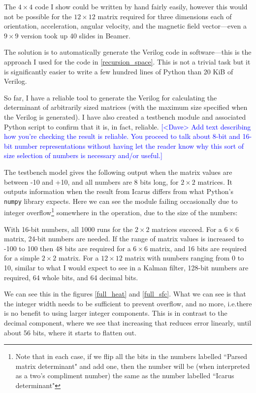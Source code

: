 \documentclass[12pt]{article}
\newcommand{\note}[2][red]{\textcolor{#1}{#2}}
\newcommand{\notedme}[1]{\note[blue]{[<Dave> #1]}}
\begin{document}
The $4\times4$ code I show could be written by hand fairly easily, however this would not be possible for the $12\times12$ matrix required for three dimensions each of orientation, acceleration, angular velocity, and the magnetic field vector---even a $9\times9$ version took up 40 slides in Beamer.

The solution is to automatically generate the Verilog code in software---this is the approach I used for the code in \ref{recursion_space}. This is not a trivial task but it is significantly easier to write a few hundred lines of Python than 20 KiB of Verilog.

So far, I have a reliable tool to generate the Verilog for calculating the determinant of arbitrarily sized matrices (with the maximum size specified when the Verilog is generated). I have also created a testbench module and associated Python script to confirm that it is, in fact, reliable.
\notedme{Add text describing how you're checking the result is reliable. You proceed to talk about 8-bit and 16-bit number representations without having let the reader know why this sort of size selection of numbers is necessary and/or useful.}

The testbench model gives the following output when the matrix values are between -10 and +10, and all numbers are 8 bits long, for $2\times2$ matrices. It outputs information when the result from Icarus differs from what Python's \lstinline|numpy| library expects. Here we can see the module failing occasionally due to integer overflow\footnote{Note that in each case, if we flip all the bits in the numbers labelled ``Parsed matrix determinant" and add one, then the number will be (when interpreted as a two's compliment number) the same as the number labelled ``Icarus determinant"} somewhere in the operation, due to the size of the numbers:



With 16-bit numbers, all 1000 runs for the $2\times2$ matrices succeed. For a $6\times6$ matrix, 24-bit numbers are needed. If the range of matrix values is increased to -100 to 100 then 48 bits are required for a $6\times6$ matrix, and 16 bits are required for a simple $2\times2$ matrix. For a $12\times12$ matrix with numbers ranging from 0 to 10, similar to what I would expect to see in a Kalman filter, 128-bit numbers are required, 64 whole bits, and 64 decimal bits.

We can see this in the figures \ref{full_heat} and \ref{full_sfc}. What we can see is that the integer width needs to be sufficient to prevent overflow, and no more, i.e.\@ there is no benefit to using larger integer components. This is in contrast to the decimal component, where we see that increasing that reduces error linearly, until about 56 bits, where it starts to flatten out.
\end{document}
